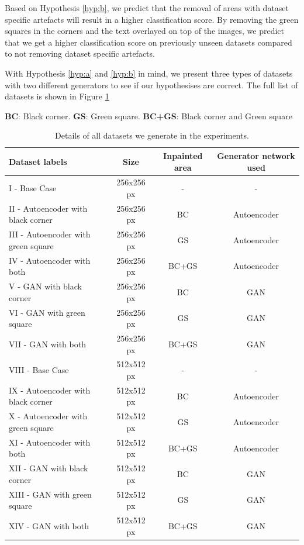 Based on Hypothesis \ref{hyp:b}, we predict that the removal of areas with dataset specific artefacts will result in a higher classification score.  By removing the green squares in the corners and the text overlayed on top of the images, we predict that we get a higher classification score on previously unseen datasets compared to not removing dataset specific artefacts.


With Hypothesis \ref{hyp:a} and \ref{hyp:b} in mind, we present three types of datasets with two different generators to see if our hypothesises are correct. The full list of datasets is shown in Figure \ref{tab:datasets}




\begin{table}[h]
\centering
\footnotesize
\caption*{\small \textbf{BC}: Black corner. \textbf{GS}: Green square. \textbf{BC+GS}: Black corner and Green square}
\begin{tabular}{lccc}
\toprule
{Dataset labels} & {Size} & {Inpainted area} & {Generator network used} \\ 
\midrule
I    - Base Case                       & 256x256 px         & -        & -                   \\
II   - Autoencoder with black corner   & 256x256 px         & BC       & Autoencoder         \\
III  - Autoencoder with green square   & 256x256 px         & GS       & Autoencoder         \\
IV   - Autoencoder with both           & 256x256 px         & BC+GS    & Autoencoder         \\
V    - GAN with black corner           & 256x256 px         & BC       & GAN                 \\
VI   - GAN with green square   		   & 256x256 px         & GS       & GAN                 \\
VII  - GAN with both                   & 256x256 px         & BC+GS    & GAN                 \\
VIII - Base Case					   & 512x512 px         & -        & -                   \\
IX - Autoencoder with black corner     & 512x512 px         & BC       & Autoencoder         \\
X - Autoencoder with green square      & 512x512 px         & GS       & Autoencoder         \\
XI - Autoencoder with both   		   & 512x512 px         & BC+GS    & Autoencoder         \\
XII - GAN with black corner            & 512x512 px         & BC       & GAN                 \\
XIII - GAN with green square           & 512x512 px         & GS       & GAN                 \\
XIV - GAN with both           	  	   & 512x512 px         & BC+GS    & GAN                 \\
\bottomrule
\end{tabular}%
\caption{Details of all datasets we generate in the experiments.} 
\label{tab:datasets}
\end{table}


